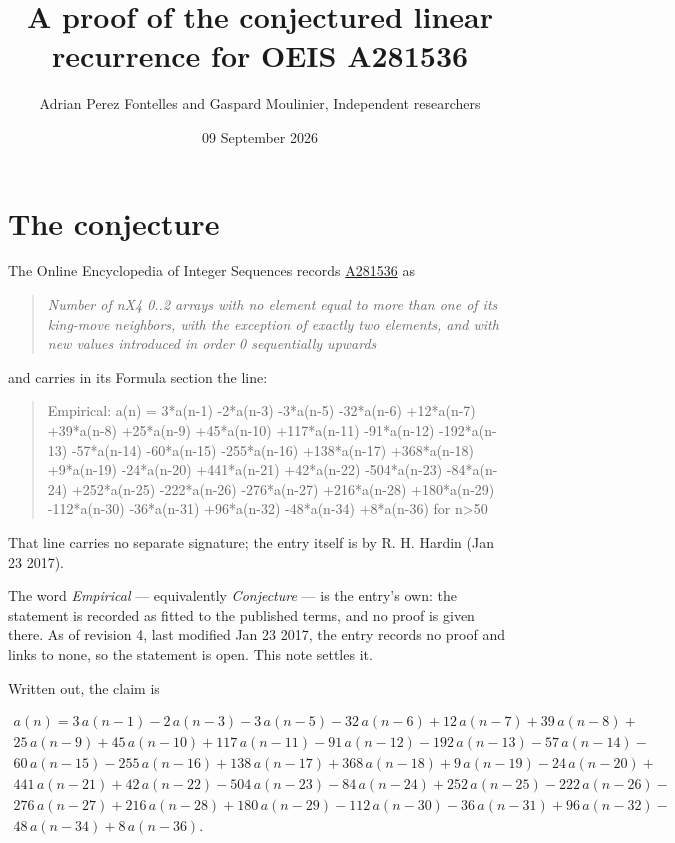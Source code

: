 \documentclass[11pt]{article}
\title{A proof of the conjectured linear recurrence for OEIS A281536}
\author{Adrian Perez Fontelles and Gaspard Moulinier, Independent researchers}
\date{09 September 2026}
\theoremstyle{definition}
\begin{document}
\maketitle
\section{The conjecture}

The Online Encyclopedia of Integer Sequences records \href{https://oeis.org/A281536}{A281536} as

\begin{quote}\itshape Number of nX4 0..2 arrays with no element equal to more than one of its king-move neighbors, with the exception of exactly two elements, and with new values introduced in order 0 sequentially upwards\end{quote}

and carries in its Formula section the line:

\begin{quote}\ttfamily Empirical: a(n) = 3*a(n-1) -2*a(n-3) -3*a(n-5) -32*a(n-6) +12*a(n-7) +39*a(n-8) +25*a(n-9) +45*a(n-10) +117*a(n-11) -91*a(n-12) -192*a(n-13) -57*a(n-14) -60*a(n-15) -255*a(n-16) +138*a(n-17) +368*a(n-18) +9*a(n-19) -24*a(n-20) +441*a(n-21) +42*a(n-22) -504*a(n-23) -84*a(n-24) +252*a(n-25) -222*a(n-26) -276*a(n-27) +216*a(n-28) +180*a(n-29) -112*a(n-30) -36*a(n-31) +96*a(n-32) -48*a(n-34) +8*a(n-36) for n>50\end{quote}

That line carries no separate signature; the entry itself is by R. H. Hardin (Jan 23 2017).

The word {\itshape Empirical} --- equivalently {\itshape Conjecture} --- is the entry's own: the statement is recorded as fitted to the published terms, and no proof is given there. As of revision 4, last modified Jan 23 2017, the entry records no proof and links to none, so the statement is open. This note settles it.

Written out, the claim is

\begin{multline*} a(n) = 3\,a(n-1) - 2\,a(n-3) - 3\,a(n-5) - 32\,a(n-6) + 12\,a(n-7) + 39\,a(n-8) + \\ 25\,a(n-9) + 45\,a(n-10) + 117\,a(n-11) - 91\,a(n-12) - 192\,a(n-13) - 57\,a(n-14) - \\ 60\,a(n-15) - 255\,a(n-16) + 138\,a(n-17) + 368\,a(n-18) + 9\,a(n-19) - 24\,a(n-20) + \\ 441\,a(n-21) + 42\,a(n-22) - 504\,a(n-23) - 84\,a(n-24) + 252\,a(n-25) - 222\,a(n-26) - \\ 276\,a(n-27) + 216\,a(n-28) + 180\,a(n-29) - 112\,a(n-30) - 36\,a(n-31) + 96\,a(n-32) - \\ 48\,a(n-34) + 8\,a(n-36). \end{multline*}
\end{document}
